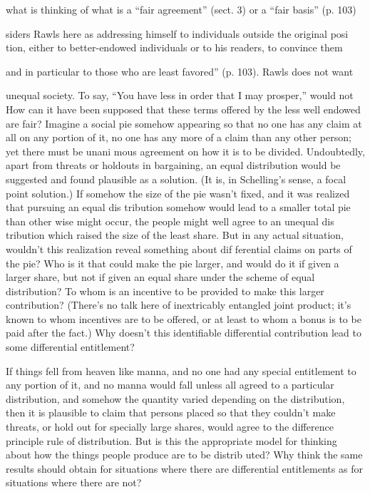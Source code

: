 \documentclass[11pt,openany]{book}
\begin{document}
what is thinking of what is a ``fair agreement'' (sect. 3) or a ``fair basis'' (p. 103) 

siders Rawls here as addressing himself to individuals outside the original posi tion, either to better-endowed individuals or to his readers, to convince them 

and in particular to those who are least favored'' (p. 103). Rawls does not want 

unequal society. To say, ``You have less in order that I may prosper,'' would not How can it have been supposed that these terms offered by the less well endowed are fair? Imagine a social pie somehow appearing so that no one has any claim at all on any portion of it, no one has any more of a claim than any other person; yet there must be unani mous agreement on how it is to be divided. Undoubtedly, apart from threats or holdouts in bargaining, an equal distribution would be suggested and found plausible as a solution. (It is, in Schelling's sense, a focal point solution.) If somehow the size of the pie wasn't fixed, and it was realized that pursuing an equal dis tribution somehow would lead to a smaller total pie than other wise might occur, the people might well agree to an unequal dis tribution which raised the size of the least share. But in any actual situation, wouldn't this realization reveal something about dif ferential claims on parts of the pie? Who is it that could make the pie larger, and would do it if given a larger share, but not if given an equal share under the scheme of equal distribution? To whom is an incentive to be provided to make this larger contribution? (There's no talk here of inextricably entangled joint product; it's known to whom incentives are to be offered, or at least to whom a bonus is to be paid after the fact.) Why doesn't this identifiable differential contribution lead to some differential entitlement? 

If things fell from heaven like manna, and no one had any special entitlement to any portion of it, and no manna would fall unless all agreed to a particular distribution, and somehow the quantity varied depending on the distribution, then it is plausible to claim that persons placed so that they couldn't make threats, or hold out for specially large shares, would agree to the difference principle rule of distribution. But is this the appropriate model for thinking about how the things people produce are to be distrib uted? Why think the same results should obtain for situations where there are differential entitlements as for situations where there are not? 
\end{document}
